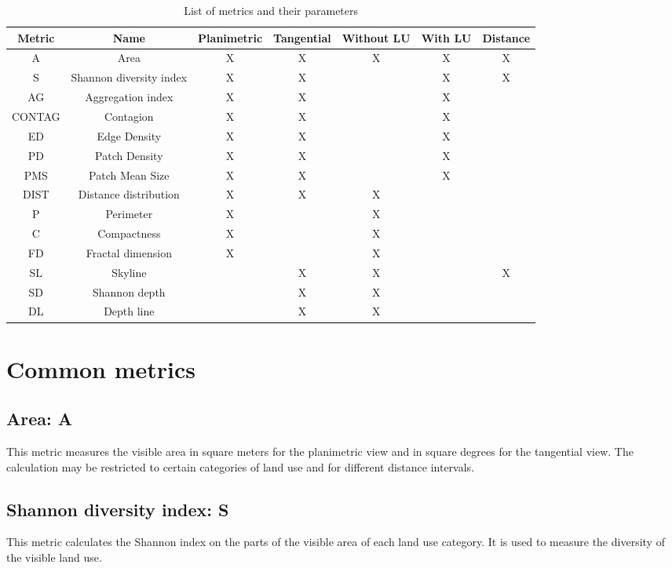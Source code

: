 \documentclass{report}
\begin{document}
\begin{table}[H]
	\begin{tabular}{|c|c|c|c|c|c|c|}
		\hline
		Metric & Name & Planimetric & Tangential & Without LU & With LU & Distance\\
		\hline
		A & Area & X & X & X & X & X\\
		\hline
		S & Shannon diversity index & X & X &  & X & X\\
		\hline
		AG & Aggregation index & X & X &  & X & \\
		\hline
		CONTAG & Contagion & X & X &  & X & \\
		\hline
		ED & Edge Density & X & X &  & X & \\
		\hline
		PD & Patch Density & X & X &  & X & \\
		\hline
		PMS & Patch Mean Size & X & X &  & X & \\
		\hline
		DIST & Distance distribution & X & X & X &  & \\
		\hline
		P & Perimeter & X &  & X &  & \\
		\hline
		C & Compactness & X &  & X &  & \\
		\hline
		FD & Fractal dimension & X &  & X &  & \\
		\hline
		SL & Skyline &  & X & X &  & X \\
		\hline
		SD & Shannon depth &  & X & X &  & \\
		\hline
		DL & Depth line &  & X & X &  & \\		
		\hline
	\end{tabular}
	\caption{List of metrics and their parameters}
	\label{metrics_tab}
\end{table}

\section{Common metrics}

\subsection{Area: A}
This metric measures the visible area in square meters for the planimetric view and in square degrees for the tangential view. The calculation may be restricted to certain categories of land use and for different distance intervals.

\subsection{Shannon diversity index: S}
This metric calculates the Shannon index on the parts of the visible area of each land use category. It is used to measure the diversity of the visible land use.
\end{document}
